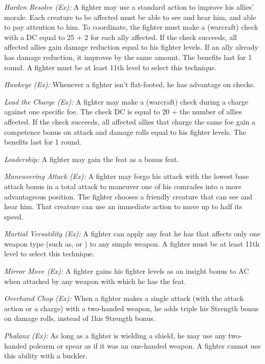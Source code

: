 \textit{Harden Resolve (Ex):} A fighter may use a standard action to improve his allies' morale. Each creature to be affected must be able to see and hear him, and able to pay attention to him. To coordinate, the fighter must make a  (warcraft) check with a DC equal to 25 + 2 for each ally affected. If the check succeeds, all affected allies gain damage reduction equal to \onequarter his fighter levels. If an ally already has damage reduction, it improves by the same amount. The benefits last for 1 round. A fighter must be at least 11th level to select this technique.

\textit{Hawkeye (Ex):} Whenever a fighter isn't flat-footed, he has advantage on  checks.

\textit{Lead the Charge (Ex):} A fighter may make a  (warcraft) check during a charge against one specific foe. The check DC is equal to 20 + the number of allies affected. If the check succeeds, all affected allies that charge the same foe gain a competence bonus on attack and damage rolls equal to \onequarter his fighter levels. The benefits last for 1 round.

\textit{Leadership:} A fighter may gain the  feat as a bonus feat.

\textit{Maneuvering Attack (Ex):} A fighter may forgo his attack with the lowest base attack bonus in a total attack to maneuver one of his comrades into a more advantageous position. The fighter chooses a friendly creature that can see and hear him. That creature can use an immediate action to move up to half its speed.

\textit{Martial Versatility (Ex):} A fighter can apply any feat he has that affects only one weapon type (such as,  or ) to any simple weapon. A fighter must be at least 11th level to select this technique.

\textit{Mirror Move (Ex):} A fighter gains \onequarter his fighter levels as an insight bonus to AC when attacked by any weapon with which he has the  feat.

\textit{Overhand Chop (Ex):} When a fighter makes a single attack (with the attack action or a charge) with a two-handed weapon, he adds triple his Strength bonus on damage rolls, instead of 1\onehalf his Strength bonus.

\textit{Phalanx (Ex):} As long as a fighter is wielding a shield, he may use any two-handed polearm or spear as if it was an one-handed weapon. A fighter cannot use this ability with a buckler.

